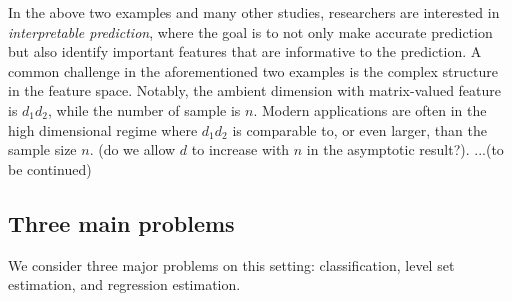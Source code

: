 \documentclass[12pt]{article}
\begin{document}
In the above two examples and many other studies, researchers are interested in \emph{interpretable prediction}, where the goal is to not only make accurate prediction but also identify important features that are informative to the prediction. A common challenge in the aforementioned two examples is the complex structure in the feature space. Notably, the ambient dimension with matrix-valued feature is $d_1d_2$, while the number of sample is $n$. Modern applications are often in the high dimensional regime where $d_1d_2$ is comparable to, or even larger, than the sample size $n$. (do we allow $d$ to increase with $n$ in the asymptotic result?). ...(to be continued)

\subsection{Three main problems}
We consider three major problems on this setting: classification, level set estimation, and regression estimation.
\end{document}
